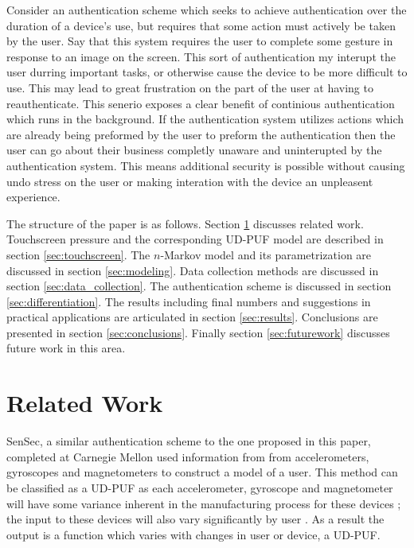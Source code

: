 \documentclass{acm_proc_article-sp}
\begin{document}
Consider an authentication scheme which seeks to achieve authentication over the duration of a device's use, but requires that some action must actively be taken by the user. Say that this system requires the user to complete some gesture in response to an image on the screen.
This sort of authentication my interupt the user durring important tasks, or otherwise cause the device to be more difficult to use.
This may lead to great frustration on the part of the user at having to reauthenticate.
This senerio exposes a clear benefit of continious authentication which runs in the background. If the authentication system utilizes actions which are already being preformed by the user to preform the authentication then the user can go about their business completly unaware and uninterupted by the authentication system. 
This means additional security is possible without causing undo stress on the user or making interation with the device an unpleasent experience.


The structure of the paper is as follows. Section \ref{sec:related_work} discusses related work. Touchscreen pressure and the corresponding UD-PUF model are described in section \ref{sec:touchscreen}. The $n$-Markov model and its parametrization are discussed in section \ref{sec:modeling}. 
Data collection methods are discussed in section \ref{sec:data_collection}. The authentication scheme is discussed in section \ref{sec:differentiation}. The results including final numbers and suggestions in practical applications are articulated in section \ref{sec:results}. Conclusions are presented in section \ref{sec:conclusions}. Finally section \ref{sec:futurework} discusses future work in this area. 

\section{Related Work}
\label{sec:related_work}
SenSec, a similar authentication scheme to the one proposed in this paper, completed at Carnegie Mellon used information from from accelerometers, gyroscopes and magnetometers to construct a model of a user. \cite{zhu2013sensec} This method can be classified as a UD-PUF as each accelerometer, gyroscope and magnetometer will have some variance inherent in the manufacturing process for these devices \cite{?}; the input to these devices will also vary significantly by user \cite{?}. As a result the output is a function which varies with changes in user or device, a UD-PUF.
\end{document}
